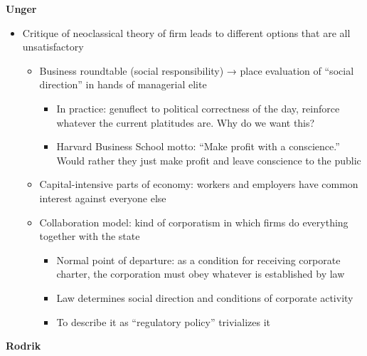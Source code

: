 \textbf{Unger}

\begin{itemize}
\tightlist
\item
  Critique of neoclassical theory of firm leads to different options
  that are all unsatisfactory

  \begin{itemize}
  \tightlist
  \item
    Business roundtable (social responsibility) → place evaluation of
    ``social direction'' in hands of managerial elite

    \begin{itemize}
    \tightlist
    \item
      In practice: genuflect to political correctness of the day,
      reinforce whatever the current platitudes are. Why do we want
      this?
    \item
      Harvard Business School motto: ``Make profit with a conscience.''
      Would rather they just make profit and leave conscience to the
      public
    \end{itemize}
  \item
    Capital-intensive parts of economy: workers and employers have
    common interest against everyone else
  \item
    Collaboration model: kind of corporatism in which firms do
    everything together with the state

    \begin{itemize}
    \tightlist
    \item
      Normal point of departure: as a condition for receiving corporate
      charter, the corporation must obey whatever is established by law
    \item
      Law determines social direction and conditions of corporate
      activity
    \item
      To describe it as ``regulatory policy'' trivializes it
    \end{itemize}
  \end{itemize}
\end{itemize}

\textbf{Rodrik}

